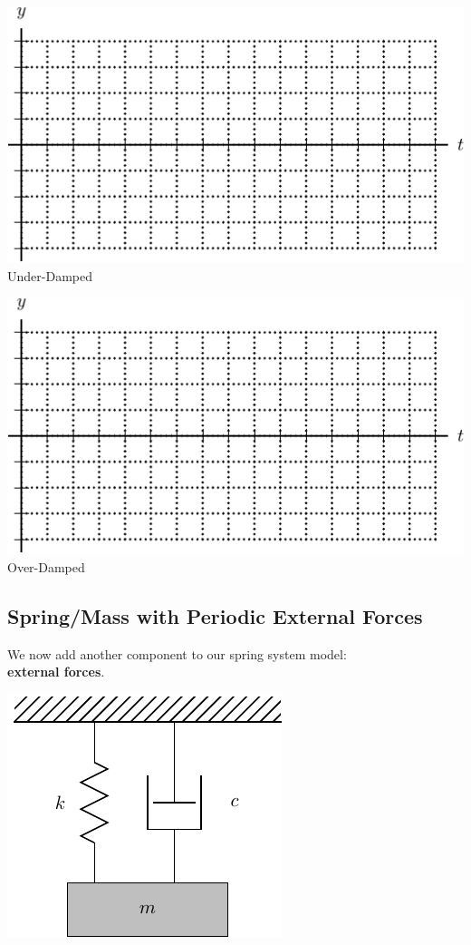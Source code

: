   \begin{minipage}[h]{0.475\linewidth}
    \begin{center}
      
   \vspace{0pt} 
   \includegraphics[width=0.9\linewidth]{graphics/notes_08_spring_mass_axes}\\
Under-Damped  

\hrulefill

   \includegraphics[width=0.9\linewidth]{graphics/notes_08_spring_mass_axes}\\
Over-Damped
    \end{center}
  \end{minipage}

\newpage
{}
\subsection*{Spring/Mass with Periodic External Forces }

We now add another component to our spring system model: \\{\bf
  external forces}.

 \includegraphics[width=0.25\linewidth]{graphics/notes_08_hanging_mass}

